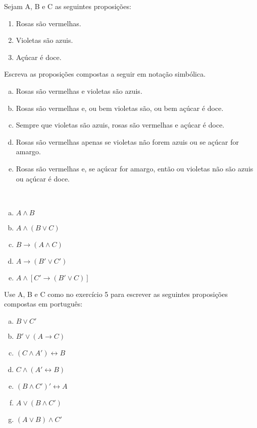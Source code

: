 \documentclass[a4paper, 12pt, addpoints]{exam}
\begin{document}
\begin{questions}
  \question Sejam A, B e C as seguintes proposições:
  \begin{enumerate}[A -]
    \item Rosas são vermelhas.
    \item Violetas são azuis.
    \item Açúcar é doce.
  \end{enumerate}

  Escreva as proposições compostas a seguir em notação simbólica.

  \begin{enumerate}[a)]
    \item Rosas são vermelhas e violetas são azuis.
    \item Rosas são vermelhas e, ou bem violetas são, ou bem açúcar é doce.
    \item Sempre que violetas são azuis, rosas são vermelhas e açúcar é doce.
    \item Rosas são vermelhas apenas se violetas não forem azuis ou se açúcar for
          amargo.
    \item Rosas são vermelhas e, se açúcar for amargo, então ou violetas não são azuis
          ou açúcar é doce.
  \end{enumerate}

  \begin{resp}~
    \begin{multicols}{3}
      \begin{enumerate}[a)]
        \item $A \wedge B$
        \item $A \wedge (B \vee C)$
        \item $B \rightarrow (A \wedge C)$
        \item $A \rightarrow (B' \vee C')$
        \item $A \wedge [C' \rightarrow (B' \vee C)]$
      \end{enumerate}
    \end{multicols}
  \end{resp}


  \question Use A, B e C como no exercício 5 para escrever as seguintes proposições compostas
  em português:
  \begin{multicols}{2}
    \begin{enumerate}[a)]
      \item $B \vee C'$
      \item $B' \vee (A \rightarrow C)$
      \item $(C \wedge A') \leftrightarrow B$
      \item $C \wedge (A' \leftrightarrow B)$
      \item $(B \wedge C')' \leftrightarrow A$
      \item $A \vee (B \wedge C')$
      \item $(A \vee B) \wedge C'$
    \end{enumerate}
  \end{multicols}


\end{questions}
\end{document}
